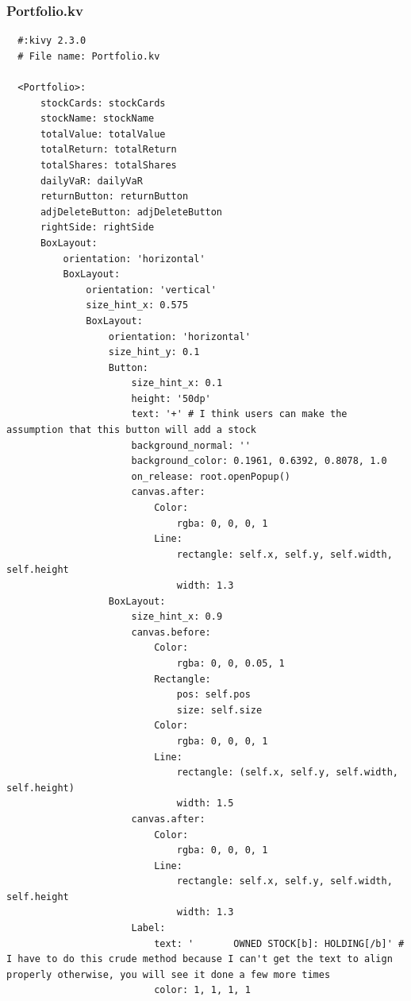 \documentclass{article}
\begin{document}
\subsubsection{Portfolio.kv}
\begin{verbatim}
  #:kivy 2.3.0
  # File name: Portfolio.kv

  <Portfolio>:
      stockCards: stockCards
      stockName: stockName
      totalValue: totalValue
      totalReturn: totalReturn
      totalShares: totalShares
      dailyVaR: dailyVaR
      returnButton: returnButton
      adjDeleteButton: adjDeleteButton
      rightSide: rightSide
      BoxLayout:
          orientation: 'horizontal' 
          BoxLayout:
              orientation: 'vertical'
              size_hint_x: 0.575
              BoxLayout:
                  orientation: 'horizontal'
                  size_hint_y: 0.1
                  Button:
                      size_hint_x: 0.1
                      height: '50dp'
                      text: '+' # I think users can make the assumption that this button will add a stock
                      background_normal: ''
                      background_color: 0.1961, 0.6392, 0.8078, 1.0
                      on_release: root.openPopup()
                      canvas.after:
                          Color:
                              rgba: 0, 0, 0, 1
                          Line:
                              rectangle: self.x, self.y, self.width, self.height
                              width: 1.3
                  BoxLayout:
                      size_hint_x: 0.9
                      canvas.before:
                          Color:
                              rgba: 0, 0, 0.05, 1
                          Rectangle:
                              pos: self.pos
                              size: self.size
                          Color:
                              rgba: 0, 0, 0, 1 
                          Line:
                              rectangle: (self.x, self.y, self.width, self.height)
                              width: 1.5
                      canvas.after:
                          Color:
                              rgba: 0, 0, 0, 1
                          Line:
                              rectangle: self.x, self.y, self.width, self.height
                              width: 1.3
                      Label:
                          text: '       OWNED STOCK[b]: HOLDING[/b]' # I have to do this crude method because I can't get the text to align properly otherwise, you will see it done a few more times
                          color: 1, 1, 1, 1

\end{verbatim}
\end{document}
